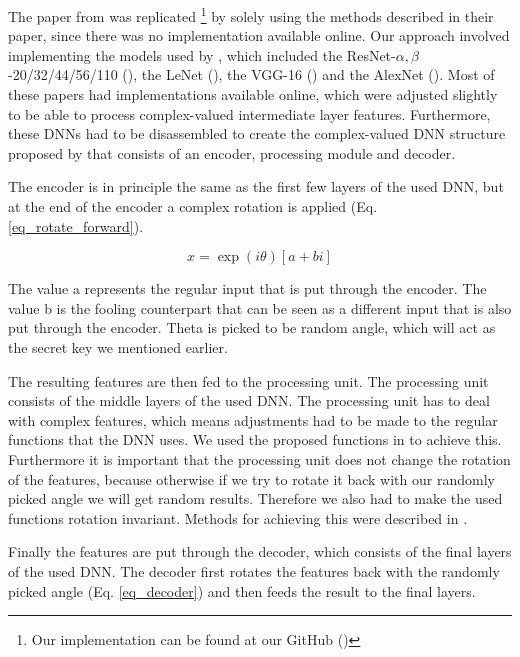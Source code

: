 The paper from \cite{xiang2020interpretable} was replicated \footnote{Our implementation can be found at our GitHub (\cite{github-gana-fact-ai})} by solely using the methods described in their paper, since there was no implementation available online. Our approach involved implementing the models used by \cite{xiang2020interpretable}, which included the ResNet-$\alpha,\beta$-20/32/44/56/110 (\cite{DBLP:journals/corr/HeZRS15}), the LeNet (\cite{lecun1998gradient}), the VGG-16 (\cite{simonyan2015deep}) and the AlexNet (\cite{NIPS2012_c399862d}). Most of these papers had implementations available online, which were adjusted slightly to be able to process complex-valued intermediate layer features. Furthermore, these DNNs had to be disassembled to create the complex-valued DNN structure proposed by \cite{xiang2020interpretable} that consists of an encoder, processing module and decoder.

The encoder is in principle the same as the first few layers of the used DNN, but at the end of the encoder a complex rotation is applied (Eq. \ref{eq_rotate_forward}).

\begin{equation}
    x = \exp(i\theta)[a+bi]
    \label{eq_rotate_forward}
\end{equation}

The value a represents the regular input that is put through the encoder. The value b is the fooling counterpart that can be seen as a different input that is also put through the encoder. Theta is picked to be random angle, which will act as the secret key we mentioned earlier.

The resulting features are then fed to the processing unit. The processing unit consists of the middle layers of the used DNN. The processing unit has to deal with complex features, which means adjustments had to be made to the regular functions that the DNN uses. We used the proposed functions in \cite{DBLP:journals/corr/TrabelsiBSSSMRB17} to achieve this. Furthermore it is important that the processing unit does not change the rotation of the features, because otherwise if we try to rotate it back with our randomly picked angle we will get random results. Therefore we also had to make the used functions rotation invariant. Methods for achieving this were described in \cite{xiang2020interpretable}.

Finally the features are put through the decoder, which consists of the final layers of the used DNN. The decoder first rotates the features back with the randomly picked angle (Eq. \ref{eq_decoder}) and then feeds the result to the final layers.

